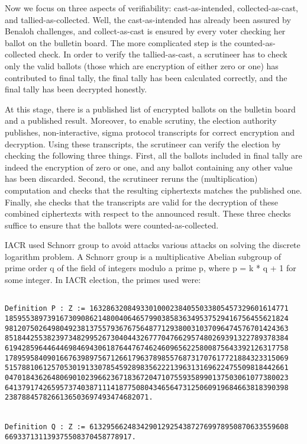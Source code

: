 Now we focus on three aspects of verifiability: cast-as-intended, collected-as-cast, 
and tallied-as-collected. Well, the cast-as-intended has already been assured 
by Benaloh challenges, and collect-as-cast is ensured by every voter 
checking her ballot on the bulletin board. 
The more complicated step is the counted-as-collected
check.  In order to verify the tallied-as-cast, a scrutineer has to check 
only the valid ballots (those which are encryption of either zero or one) 
has contributed to final tally, the final tally has been calculated 
correctly, and the final tally has been decrypted honestly. 

At this stage, there is a published list of encrypted ballots on the bulletin board
and a published result.  Moreover, to enable scrutiny, the election authority publishes, 
non-interactive, sigma protocol transcripts for correct encryption and decryption. 
Using these transcripts,  the scrutineer can verify the election by checking the following
three things. First, all the ballots included in final tally are indeed the encryption of 
zero or one, and any ballot containing any other value has been discarded. 
Second, the scrutineer reruns the (multiplication)
computation and checks that the resulting ciphertexts matches the published one.
Finally, she checks that the transcripts are valid for the decryption of these
combined ciphertexts with respect to the announced result.  These  three checks
suffice to ensure that the ballots were counted-as-collected. 


IACR used Schnorr group to avoid attacks various attacks on solving the discrete 
logarithm problem.  A Schnorr group is a multiplicative Abelian subgroup of prime order q of the field of 
integers modulo a prime p, where p = k * q + 1 for some integer.   In IACR election, 
the primes used were:
\begin{verbatim}

Definition P : Z := 16328632084933010002384055033805457329601614771
1859553897391673090862148004064657990385836349537529416756455621824
9812075026498049238137557936767564877129380031037096474576701424363
8518442553823973482995267304044326777047662957480269391322789378384
6194285964464469846943061876447674624609656225800875643392126317758
1789595840901667639897567126617963789855768731707617721884323315069
5157881061257053019133078545928983562221396313169622475509818442661
0470184362648069010239662367183672047107559358990137503061077380023
6413791742659573740387111418775080434656473125060919684663818390398
2387884578266136503697493474682071.


Definition Q : Z := 61329566248342901292543872769978950870633559608
669337131139375508370458778917.


\end{verbatim}

